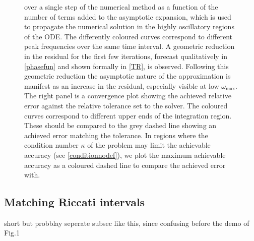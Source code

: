 \documentclass[10pt]{article}
\newcommand{\AB}[1]{{\color{orange}#1}}
\begin{document}
\begin{figure}[tb]
{    over a single step of the numerical method as a function of the number of
    terms added to the asymptotic expansion, which is used to propagate the
    numerical solution in the highly oscillatory regions of the ODE. The
    differently coloured curves correspond to different peak frequencies over
    the same time interval. A geometric reduction in the residual for the first
    few iterations, forecast qualitatively in \cref{phasefun} and shown formally in
    \cref{TR}, is observed. Following this geometric reduction the
    asymptotic nature of the approximation is manifest as an increase in the
    residual, especially visible at low $\omega_{\text{max}}$. The right panel
    is a convergence plot showing the achieved relative error against the
    relative tolerance set to the solver. The coloured curves correspond to
    different upper ends of the integration region. These should be compared to
    the grey dashed line showing an achieved error matching the tolerance.
    In regions where the condition number $\kappa$ of the problem may limit the achievable
    accuracy (see \cref{conditionnodef}), we plot the maximum achievable
    accuracy as a coloured dashed line to compare the achieved error with. }
\end{figure}



\subsection{Matching Riccati intervals}
\AB{short but probblay seperate subsec like this, since confusing before
  the demo of Fig.1}
\end{document}
